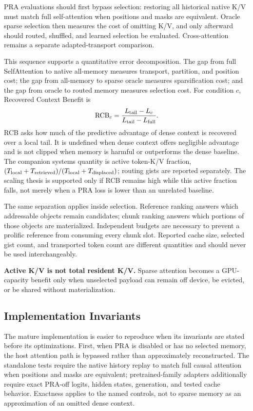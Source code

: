 \documentclass[11pt]{article}
\begin{document}
PRA evaluations should first bypass selection: restoring all historical native K/V must match full self-attention when positions and masks are equivalent. Oracle sparse selection then measures the cost of omitting K/V, and only afterward should routed, shuffled, and learned selection be evaluated. Cross-attention remains a separate adapted-transport comparison.

This sequence supports a quantitative error decomposition. The gap from full
SelfAttention to native all-memory measures transport, partition, and position cost; the
gap from all-memory to sparse oracle measures sparsification cost; and the gap from oracle
to routed memory measures selection cost. For condition $c$, Recovered Context Benefit
is
\begin{equation}
\mathrm{RCB}_c =
\frac{L_{\rm tail}-L_c}{L_{\rm tail}-L_{\rm full}}.
\end{equation}
RCB asks how much of the predictive advantage of dense context is recovered over a local
tail. It is undefined when dense context offers negligible advantage and is not clipped
when memory is harmful or outperforms the dense baseline. The companion systems quantity
is active token-K/V fraction,
$(T_{\rm local}+T_{\rm retrieved})/(T_{\rm local}+T_{\rm displaced})$; routing gists are
reported separately. The scaling thesis is supported only if RCB remains high while this
active fraction falls, not merely when a PRA loss is lower than an unrelated baseline.

The same separation applies inside selection. Reference ranking answers which addressable objects remain candidates; chunk ranking answers which portions of those objects are materialized. Independent budgets are necessary to prevent a prolific reference from consuming every chunk slot. Reported cache size, selected gist count, and transported token count are different quantities and should never be used interchangeably.

\textbf{Active K/V is not total resident K/V.} Sparse attention becomes a GPU-capacity
benefit only when unselected payload can remain off device, be evicted, or be shared without
materialization.

\subsection{Implementation Invariants}

The mature implementation is easier to reproduce when its invariants are stated before its
optimizations. First, when PRA is disabled or has no selected memory, the host attention path
is bypassed rather than approximately reconstructed. The standalone tests require the native
history replay to match full causal attention when positions and masks are equivalent;
pretrained-family adapters additionally require exact PRA-off logits, hidden states,
generation, and tested cache behavior. Exactness applies to the named controls, not to sparse
memory as an approximation of an omitted dense context.
\end{document}
